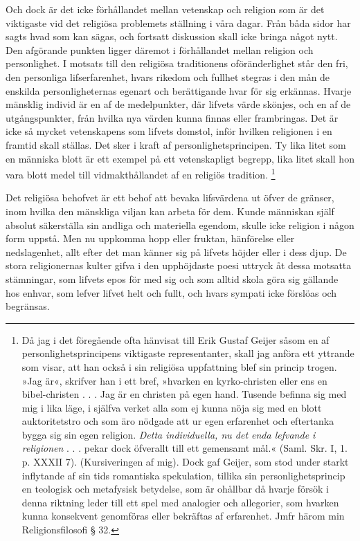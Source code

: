 \documentclass[12pt]{article}
\newcommand{\opage}[1]{\marginnote{\footnotesize\textit{[#1]}}}
\begin{document}
Och dock är det icke förhållandet mellan vetenskap och religion som är det viktigaste vid det religiösa problemets ställning i våra dagar. Från båda sidor har sagts hvad som kan sägas, och fortsatt diskussion skall icke bringa något nytt. Den afgörande punkten ligger däremot i förhållandet mellan religion och personlighet. I motsats till den religiösa traditionens oföränderlighet står den fri, den personliga lifserfarenhet, hvars rikedom och fullhet stegras i den mån de enskilda personligheternas egenart och berättigande hvar för sig erkännas. Hvarje mänsklig individ är en af de medelpunkter, %
\opage{67}
där lifvets värde skönjes, och en af de utgångspunkter, från hvilka nya värden kunna finnas eller frambringas. Det är icke så mycket vetenskapens som lifvets domstol, inför hvilken religionen i en framtid skall ställas. Det sker i kraft af personlighetsprincipen. Ty lika litet som en människa blott är ett exempel på ett vetenskapligt begrepp, lika litet skall hon vara blott medel till vidmakthållandet af en religiös tradition. %
\footnote[1]{Då jag i det föregående ofta hänvisat till Erik Gustaf Geijer såsom en af personlighetsprincipens viktigaste representanter, skall jag anföra ett yttrande som visar, att han också i sin religiösa uppfattning blef sin princip trogen. »Jag är«, skrifver han i ett bref, »hvarken en kyrko-christen eller ens en bibel-christen . . . Jag är en christen på egen hand. Tusende befinna sig med mig i lika läge, i själfva verket alla som ej kunna nöja sig med en blott auktoritetstro och som äro nödgade att ur egen erfarenhet och eftertanka bygga sig sin egen religion. \textit{Detta individuella, nu det enda lefvande i religionen} . . . pekar dock öfverallt till ett gemensamt mål.« (Saml. Skr. I, 1. p. XXXII 7). (Kursiveringen af mig). Dock gaf Geijer, som stod under starkt inflytande af sin tids romantiska spekulation, tillika sin personlighetsprincip en teologisk och metafysisk betydelse, som är ohållbar då hvarje försök i denna riktning leder till ett spel med analogier och allegorier, som hvarken kunna konsekvent genomföras eller bekräftas af erfarenhet. Jmfr härom min Religionsfilosofi § 32.}

\opage{68}
Det religiösa behofvet är ett behof att bevaka lifsvärdena ut öfver de gränser, inom hvilka den mänskliga viljan kan arbeta för dem. Kunde människan själf absolut säkerställa sin andliga och materiella egendom, skulle icke religion i någon form uppstå. Men nu uppkomma hopp eller fruktan, hänförelse eller nedslagenhet, allt efter det man känner sig på lifvets höjder eller i dess djup. De stora religionernas kulter gifva i den upphöjdaste poesi uttryck åt dessa motsatta stämningar, som lifvets epos för med sig och som alltid skola göra sig gällande hos enhvar, som lefver lifvet helt och fullt, och hvars sympati icke förslöas och begränsas. 
\end{document}

